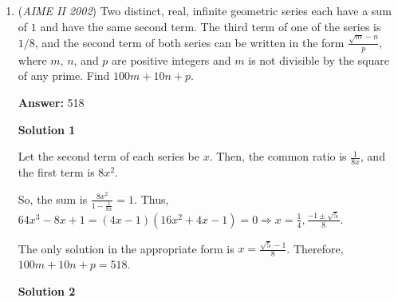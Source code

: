 \begin{enumerate}
 $\theta = \pi-\alpha$ yields: $x = \pi - \frac{\pi x}{180} \Rightarrow x = \frac{180\pi}{180+\pi} \Rightarrow (p,q) = (180,180)$. 

 $\theta = 2\pi + \alpha$ yields: $x = 2\pi + \frac{\pi x}{180} \Rightarrow x = \frac{360\pi}{180-\pi} \Rightarrow (m,n) = (360,180)$. 

 So, $m+n+p+q = \boxed{900}$.

 



\textbf{Solution 2}

The first case is when the two angles, $x$ and $\frac{\pi x}{180}$, are coterminal. The second case is when they are reflections of the $y$ axis.

 1. $x+2\pi a = \frac{\pi x}{180}$ for any integer $a$So $x=\frac{360\pi a }{\pi -180}$

 2. $(2b+1)\pi -x = \frac{\pi x}{180}$ for any integer $b$So $x = \frac{180(2b+1)\pi}{\pi + 180}$

 Choosing carefully $a,b$ such that it's the minimum gives the answer same as above.

 


	\item (\textit{AIME II 2002}) Two distinct, real, infinite geometric series each have a sum of $1$ and have the same second term. The third term of one of the series is $1/8$, and the second term of both series can be written in the form $\frac{\sqrt{m}-n}p$, where $m$, $n$, and $p$ are positive integers and $m$ is not divisible by the square of any prime. Find $100m+10n+p$.


 
 \textbf{Answer: }518



\textbf{Solution 1}

Let the second term of each series be $x$. Then, the common ratio is $\frac{1}{8x}$, and the first term is $8x^2$. 

 So, the sum is $\frac{8x^2}{1-\frac{1}{8x}}=1$. Thus, $64x^3-8x+1 = (4x-1)(16x^2+4x-1) = 0 \Rightarrow x = \frac{1}{4}, \frac{-1 \pm \sqrt{5}}{8}$. 

 The only solution in the appropriate form is $x = \frac{\sqrt{5}-1}{8}$. Therefore, $100m+10n+p = \boxed{518}$.

 


 



\textbf{Solution 2}


\end{enumerate}
